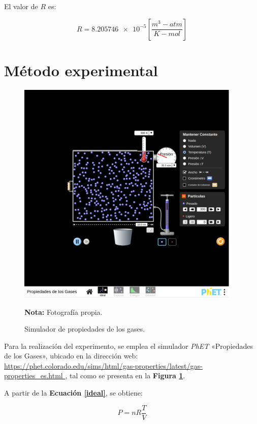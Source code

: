 \documentclass[letter,11pt]{article}
\newcommand{\source}[1]{\vspace{-11pt} \caption*{\small{\textbf{Nota:} {#1}}}}
\begin{document}
El valor de $R$ es:

\begin{equation*}
    R = \num{8.205746e-5} \left[\frac{m^3-atm}{K-mol}\right]
\end{equation*}
\vspace{0.10cm}

\section{Método experimental}

\begin{figure}
\centering
\includegraphics[width=0.95\textwidth]{resources/f2.eps}
\caption{Simulador de propiedades de los gases.}
\label{figura2}
\source{Fotografía propia.}
\end{figure}

Para la realización del experimento, se emplea el simulador \emph{PhET}
«Propiedades de los Gases», ubicado en la dirección web: \url{
https://phet.colorado.edu/sims/html/gas-properties/latest/gas-properties_es.html
}, tal como se presenta en la \textbf{Figura \ref{figura2}}.

A partir de la \textbf{Ecuación \ref{ideal}}, se obtiene:

\begin{equation*}
    P = nR\frac{T}{V}
\end{equation*}
\end{document}
